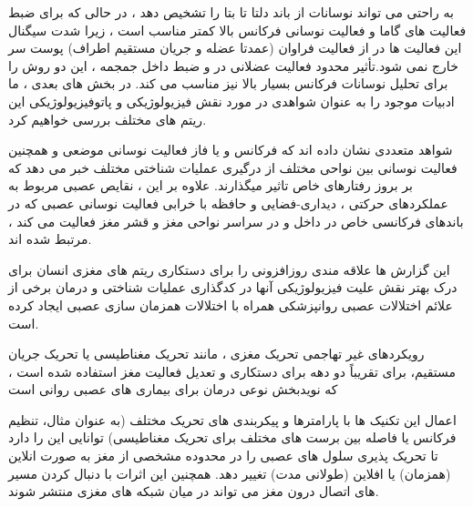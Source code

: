  به راحتی می تواند نوسانات از باند دلتا تا بتا را تشخیص دهد ، در حالی که برای ضبط فعالیت های گاما و فعالیت نوسانی فرکانس بالا کمتر مناسب است ، زیرا شدت سیگنال این فعالیت ها در  از فعالیت فراوان (عمدتا عضله و جریان مستقیم اطراف) پوست سر خارج نمی شود.تأثیر محدود فعالیت عضلانی در و ضبط داخل جمجمه ، این دو روش را برای تحلیل نوسانات فرکانس بسیار بالا نیز مناسب می کند. در بخش های بعدی ، ما ادبیات موجود را به عنوان شواهدی در مورد نقش فیزیولوژیکی و پاتوفیزیولوژیکی این ریتم های مختلف بررسی خواهیم کرد.

شواهد متعددی نشان داده اند که فرکانس و یا فاز فعالیت نوسانی موضعی و همچنین فعالیت نوسانی بین نواحی مختلف از درگیری عملیات شناختی مختلف خبر می دهد که بر بروز رفتارهای خاص تاثیر میگذارند.
علاوه بر این ، نقایص عصبی مربوط به عملکردهای حرکتی ، دیداری-فضایی و حافظه با خرابی فعالیت نوسانی عصبی که در باندهای فرکانسی خاص در داخل و در سراسر نواحی مغز و قشر مغز فعالیت می کند ، مرتبط شده اند.

این گزارش ها علاقه مندی روزافزونی را برای دستکاری ریتم های مغزی انسان برای درک بهتر نقش علیت فیزیولوژیکی آنها در کدگذاری عملیات شناختی و درمان برخی از علائم اختلالات عصبی روانپزشکی همراه با اختلالات همزمان سازی عصبی ایجاد کرده است.

رویکردهای غیر تهاجمی تحریک مغزی ، مانند تحریک مغناطیسی یا تحریک جریان مستقیم، برای تقریباً دو دهه برای دستکاری و تعدیل فعالیت مغز استفاده شده است ، که نویدبخش نوعی درمان برای  بیماری های عصبی روانی است

اعمال این تکنیک ها با پارامترها و پیکربندی های تحریک مختلف (به عنوان مثال، تنظیم فرکانس یا فاصله بین برست های مختلف برای تحریک مغناطیسی) توانایی این را دارد تا تحریک پذیری سلول های عصبی را در محدوده مشخصی از مغز به صورت انلاین (همزمان) یا افلاین (طولانی مدت) تغییر دهد. همچنین این اثرات با دنبال کردن مسیر های اتصال درون مغز می تواند در میان شبکه های مغزی منتشر شوند. 



